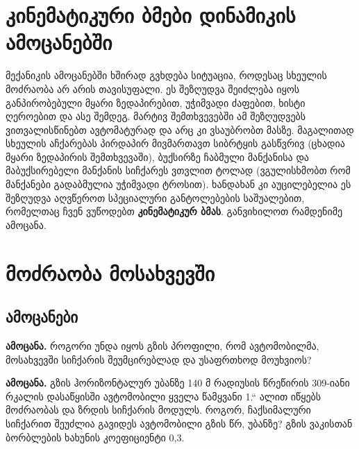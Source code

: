 \documentclass[a4paper]{book}
\begin{document}
\section{კინემატიკური ბმები დინამიკის ამოცანებში}
მექანიკის ამოცანებში ხშირად გვხდება სიტუაცია, როდესაც სხეულის მოძრაობა არ არის თავისუფალი. ეს შეზღუდვა შეიძლება იყოს განპირობებული მყარი ზედაპირებით, უჭიმვადი ძაფებით, ხისტი ღეროებით და ასე შემდეგ. მარტივ შემთხვევებში ამ შეზღუდვებს ვითვალისწინებთ ავტომატურად და არც კი ვსაუბრობთ მასზე. მაგალითად სხეულის აჩქარებას პირდაპირ მივმართავთ სიბრტყის გასწვრივ (ცხადია მყარი ზედაპირის შემთხვევაში), ბუქსირზე ჩაბმული მანქანისა და მაბუქსირებელი მანქანის სიჩქარეს ვთვლით ტოლად (ვგულისხმობთ რომ მანქანები გადაბმულია უჭიმვადი ტროსით). ხანდახან კი აუცილებელია ეს შეზღუდვა აღვწეროთ სპეციალური განტოლებების საშუალებით, რომელთაც ჩვენ ვუწოდებთ \textbf{კინემატიკურ ბმას}. განვიხილოთ რამდენიმე ამოცანა.
 
 
\section{მოძრაობა მოსახვევში}
\subsection{ამოცანები}
\textbf{ამოცანა.} როგორი უნდა იყოს გზის პროფილი, რომ ავტომობილმა, მოსახვევში სიჩქარის შეუმცირებლად და უსაფრთხოდ მოუხვიოს?

\textbf{ამოცანა.} გზის ჰორიზონტალურ უბანზე 140 მ რადიუსის წრეწირის 309-იანი რკალის დასაწყისში ავტომობილი ყველა წამყვანი 1.“
ალით იწყებს მოძრაობას და ზრდის სიჩქარის მოდულს. როგორ,
ჩაქსიმალური სიჩქარით შეუძლია გავიდეს ავტომობილი გზის წრ,
უბანზე? გზის ვაკისთან ბორბლების ხახუნის კოეფიციენტი 0,3.
\end{document}
